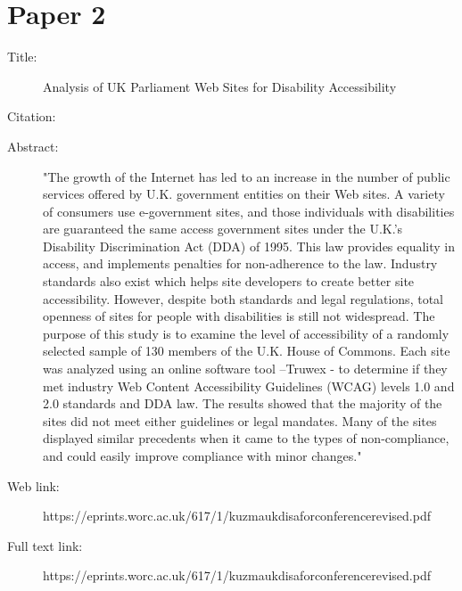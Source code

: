 \documentclass{scrartcl}
\begin{document}
\section*{Paper 2}
\begin{description}
\item[Title:] Analysis of UK Parliament Web Sites for Disability Accessibility 
\item[Citation:] \cite{Joanne M. Kuzma and Colin Price }
\item[Abstract:] "The growth of the Internet has led to an increase in the number of public services offered
by U.K. government entities on their Web sites. A variety of consumers use e-government sites, and
those individuals with disabilities are guaranteed the same access government sites under the U.K.’s
Disability Discrimination Act (DDA) of 1995. This law provides equality in access, and implements
penalties for non-adherence to the law. Industry standards also exist which helps site developers to
create better site accessibility. However, despite both standards and legal regulations, total openness
of sites for people with disabilities is still not widespread. The purpose of this study is to examine the
level of accessibility of a randomly selected sample of 130 members of the U.K. House of Commons.
Each site was analyzed using an online software tool –Truwex - to determine if they met industry Web
Content Accessibility Guidelines (WCAG) levels 1.0 and 2.0 standards and DDA law. The results
showed that the majority of the sites did not meet either guidelines or legal mandates. Many of the
sites displayed similar precedents when it came to the types of non-compliance, and could easily
improve compliance with minor changes." 
\item[Web link:] https://eprints.worc.ac.uk/617/1/kuzmaukdisaforconferencerevised.pdf 
\item[Full text link:] https://eprints.worc.ac.uk/617/1/kuzmaukdisaforconferencerevised.pdf
\end{description}
\end{document}
